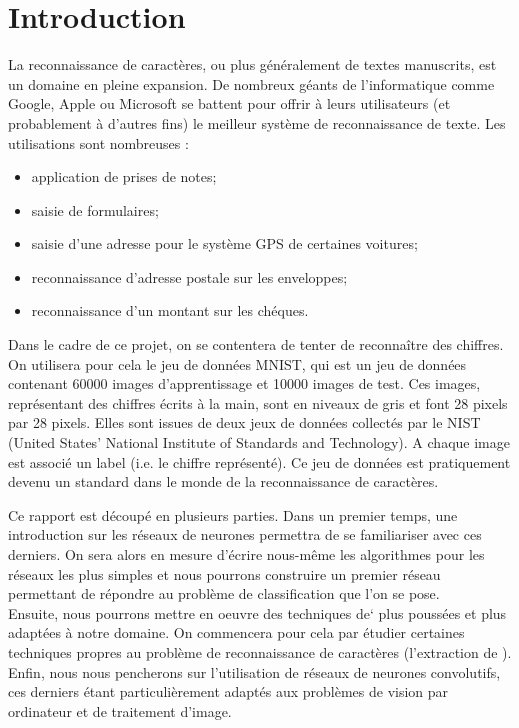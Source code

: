 
\chapter{Introduction}

La reconnaissance de caractères, ou plus généralement de textes manuscrits, est 
un domaine en pleine expansion. 
De nombreux géants de l'informatique comme Google, Apple ou Microsoft se battent pour 
offrir à leurs utilisateurs (et probablement à d'autres fins) le meilleur système 
de reconnaissance de texte. Les utilisations sont nombreuses :
\begin{itemize}
  \item application de prises de notes;
  \item saisie de formulaires;
  \item saisie d'une adresse pour le système GPS de certaines voitures;
  \item reconnaissance d'adresse postale sur les enveloppes;
  \item reconnaissance d'un montant sur les chéques.
\end{itemize}

\vspace{1em}

Dans le cadre de ce projet, on se contentera de tenter de reconnaître des chiffres. 
On utilisera pour cela le jeu de données MNIST, qui est un jeu de données contenant 
60000 images d'apprentissage et 10000 images de test. Ces images, représentant des 
chiffres écrits à la main, sont en niveaux de gris et font 28 pixels par 28 pixels.
Elles sont issues de deux jeux de données collectés par le NIST 
(United States' National Institute of Standards and Technology). 
A chaque image est associé un label (i.e.\/ le chiffre représenté). 
Ce jeu de données est pratiquement devenu un standard dans le monde de la 
reconnaissance de caractères.

Ce rapport est découpé en plusieurs parties. Dans un premier temps, une introduction 
sur les réseaux de neurones permettra de se familiariser avec ces derniers. 
On sera alors en mesure d'écrire nous-même les algorithmes pour les réseaux les 
plus simples et nous pourrons construire un premier réseau permettant de répondre 
au problème de classification que l'on se pose. \\
Ensuite, nous pourrons mettre en oeuvre des techniques de` 
plus poussées et plus adaptées à notre domaine. On commencera pour cela par 
étudier certaines techniques propres au problème de reconnaissance de caractères
(l'extraction de ).
Enfin, nous nous pencherons sur l'utilisation de réseaux de neurones convolutifs, 
ces derniers étant particulièrement adaptés aux problèmes de vision par ordinateur 
et de traitement d'image.
